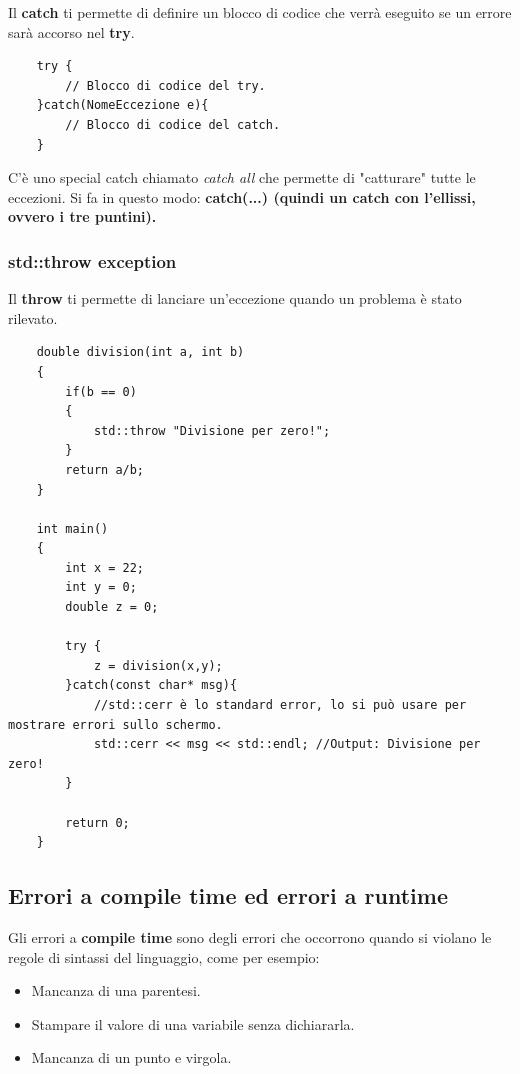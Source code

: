 \textsf{\small Il \textbf{catch} ti permette di definire un blocco di codice che verrà eseguito se un errore sarà accorso nel \textbf{try}.} \\

\begin{lstlisting}
	try {
		// Blocco di codice del try.
	}catch(NomeEccezione e){
		// Blocco di codice del catch.
	}
\end{lstlisting}

\textsf{\small C'è uno special catch chiamato \emph{catch all} che permette di "catturare" tutte le eccezioni. Si fa in questo modo: \textbf{catch(...) (quindi un catch con l'ellissi, ovvero i tre puntini).}}

\subsubsection{std::throw exception}

\textsf{\small Il \textbf{throw} ti permette di lanciare un'eccezione quando un problema è stato rilevato.} \\

\begin{lstlisting}
	double division(int a, int b)
	{
		if(b == 0)
		{
			std::throw "Divisione per zero!";
		}
		return a/b;
	}

	int main()
	{
		int x = 22;
		int y = 0;
		double z = 0;
		
		try {
			z = division(x,y);
		}catch(const char* msg){
			//std::cerr è lo standard error, lo si può usare per mostrare errori sullo schermo.
			std::cerr << msg << std::endl; //Output: Divisione per zero!
		}
	
		return 0;
	}
\end{lstlisting}

\subsection{Errori a compile time ed errori a runtime}

\textsf{\small Gli errori a \textbf{compile time} sono degli errori che occorrono quando si violano le regole di sintassi del linguaggio, come per esempio: } \\

\begin{itemize}
	\item \textsf{\small Mancanza di una parentesi.}
	\item \textsf{\small Stampare il valore di una variabile senza dichiararla.}
	\item \textsf{\small Mancanza di un punto e virgola.}
\end{itemize}

